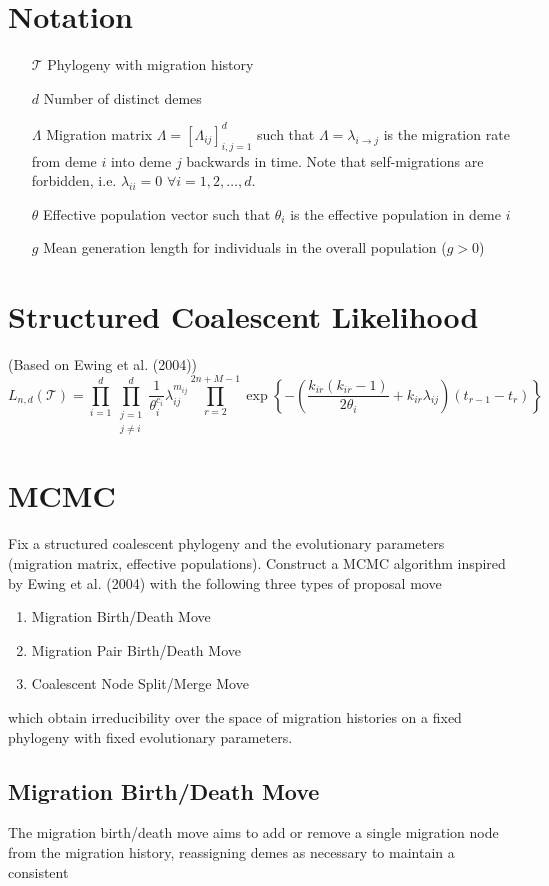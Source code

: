 \documentclass[12pt,a4paper]{article}
\newcommand{\calT}{\mathcal{T}}
\begin{document}
	\section{Notation}
		\begin{itemize}
			\item[$\calT$] Phylogeny with migration history
			\item[$d$] Number of distinct demes
			\item[$\Lambda$] Migration matrix $\Lambda = [\Lambda_{ij}]_{i,j=1}^d$ such that $\Lambda = \lambda_{i \rightarrow j}$ is the migration rate from deme $i$ into deme $j$ backwards in time. Note that self-migrations are forbidden, i.e. $\lambda_{ii} = 0$ $\forall i = 1,2, \dots, d$.
			\item[$\theta$] Effective population vector such that $\theta_i$ is the effective population in deme $i$
			\item[$g$] Mean generation length for individuals in the overall population ($g > 0$)
		\end{itemize}
	
	\section{Structured Coalescent Likelihood}
		(Based on Ewing et al. (2004))
			\begin{equation}
				L_{n,d}(\calT) = \prod_{i=1}^d \prod_{\substack{j=1 \\ j \neq i}}^d \frac{1}{\theta_i^{c_i}} \lambda_{ij}^{m_{ij}} \prod_{r=2}^{2n + M -1} \exp \left\{ - \left( \frac{k_{i r} (k_{i r} - 1)}{2 \theta_i} + k_{i r} \lambda_{i j} \right)(t_{r-1} - t_r) \right\}
			\end{equation}
	
	\section{MCMC}
		Fix a structured coalescent phylogeny and the evolutionary parameters (migration matrix, effective populations). Construct a MCMC algorithm inspired by Ewing et al. (2004) with the following three types of proposal move
			\begin{enumerate}
				\item Migration Birth/Death Move
				\item Migration Pair Birth/Death Move
				\item Coalescent Node Split/Merge Move
			\end{enumerate}
		which obtain irreducibility over the space of migration histories on a fixed phylogeny with fixed evolutionary parameters.
		
		\subsection{Migration Birth/Death Move}
			The migration birth/death move aims to add or remove a single migration node from the migration history, reassigning demes as necessary to maintain a consistent 
\end{document}
